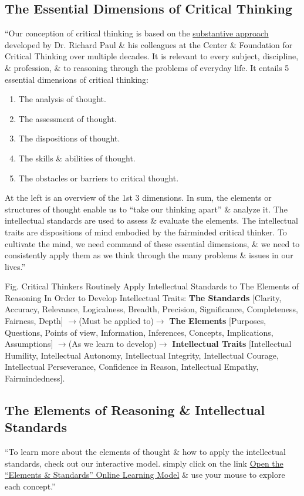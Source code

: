 \documentclass[oneside]{book}
\numberwithin{equation}{section}
\begin{document}
\subsection{The Essential Dimensions of Critical Thinking}
``Our conception of critical thinking is based on the \href{https://www.criticalthinking.org/professionalDev/the-state-ct-today.cfm}{substantive approach} developed by Dr. Richard Paul \& his colleagues at the Center \& Foundation for Critical Thinking over multiple decades. It is relevant to every subject, discipline, \& profession, \& to reasoning through the problems of everyday life. It entails 5 essential dimensions of critical thinking:
\begin{enumerate}
	\item The analysis of thought.
	\item The assessment of thought.
	\item The dispositions of thought.
	\item The skills \& abilities of thought.
	\item The obstacles or barriers to critical thought.
\end{enumerate}
At the left is an overview of the 1st 3 dimensions. In sum, the elements or structures of thought enable us to ``take our thinking apart'' \& analyze it. The intellectual standards are used to assess \& evaluate the elements. The intellectual traits are dispositions of mind embodied by the fairminded critical thinker. To cultivate the mind, we need command of these essential dimensions, \& we need to consistently apply them as we think through the many problems \& issues in our lives.''

\textsf{Fig. Critical Thinkers Routinely Apply Intellectual Standards to The Elements of Reasoning In Order to Develop Intellectual Traits: \textbf{The Standards} [Clarity, Accuracy, Relevance, Logicalness, Breadth, Precision, Significance, Completeness, Fairness, Depth] $\to$(Must be applied to)$\to$ \textbf{The Elements} [Purposes, Questions, Points of view, Information, Inferences, Concepts, Implications, Assumptions] $\to$(As we learn to develop)$\to$ \textbf{Intellectual Traits} [Intellectual Humility, Intellectual Autonomy, Intellectual Integrity, Intellectual Courage, Intellectual Perseverance, Confidence in Reason, Intellectual Empathy, Fairmindedness].}

\subsection{The Elements of Reasoning \& Intellectual Standards}
``To learn more about the elements of thought \& how to apply the intellectual standards, check out our interactive model. simply click on the link \href{javascript:void(window.open('https://www.criticalthinking.org/CTmodel/CTModel1.cfm','CTModel','resizable=yes,location=no,menubar=yes,scrollbars=yes,status=no,toolbar=no,fullscreen=no,dependent=no,width=840,height=680,left=10,top=10'))}{Open the ``Elements \& Standards'' Online Learning Model} \& use your mouse to explore each concept.''
\end{document}
